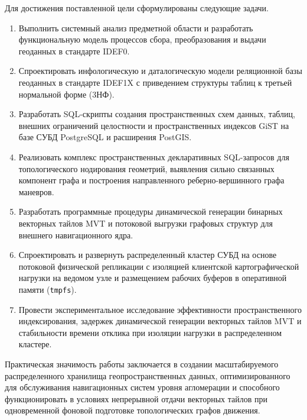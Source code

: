 Для достижения поставленной цели сформулированы следующие задачи.
\begin{enumerate}
    \item Выполнить системный анализ предметной области и разработать функциональную модель процессов сбора, преобразования и выдачи геоданных в стандарте IDEF0.
    \item Спроектировать инфологическую и даталогическую модели реляционной базы геоданных в стандарте IDEF1X с приведением структуры таблиц к третьей нормальной форме (3НФ).
    \item Разработать SQL-скрипты создания пространственных схем данных, таблиц, внешних ограничений целостности и пространственных индексов GiST на базе СУБД PostgreSQL и расширения PostGIS.
    \item Реализовать комплекс пространственных декларативных SQL-запросов для топологического нодирования геометрий, выявления сильно связанных компонент графа и построения направленного реберно-вершинного графа маневров.
    \item Разработать программные процедуры динамической генерации бинарных векторных тайлов MVT и потоковой выгрузки графовых структур для внешнего навигационного ядра.
    \item Спроектировать и развернуть распределенный кластер СУБД на основе потоковой физической репликации с изоляцией клиентской картографической нагрузки на ведомом узле и размещением рабочих буферов в оперативной памяти (\texttt{tmpfs}).
    \item Провести экспериментальное исследование эффективности пространственного индексирования, задержек динамической генерации векторных тайлов MVT и стабильности времени отклика при изоляции нагрузки в распределенном кластере.
\end{enumerate}

Практическая значимость работы заключается в создании масштабируемого распределенного хранилища геопространственных данных, оптимизированного для обслуживания навигационных систем уровня агломерации и способного функционировать в условиях непрерывной отдачи векторных тайлов при одновременной фоновой подготовке топологических графов движения.
